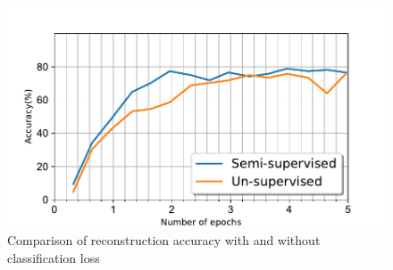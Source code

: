 \documentclass{uai2021} %
\begin{document}
\begin{figure}[!t]
\centering
\includegraphics[width=\linewidth]{reconstruction_accuracy_different_runs}
\caption{Comparison of reconstruction accuracy with and without classification loss }
\label{reconstruction_accuracy_sup_vs_unsup}
\end{figure}
\end{document}
